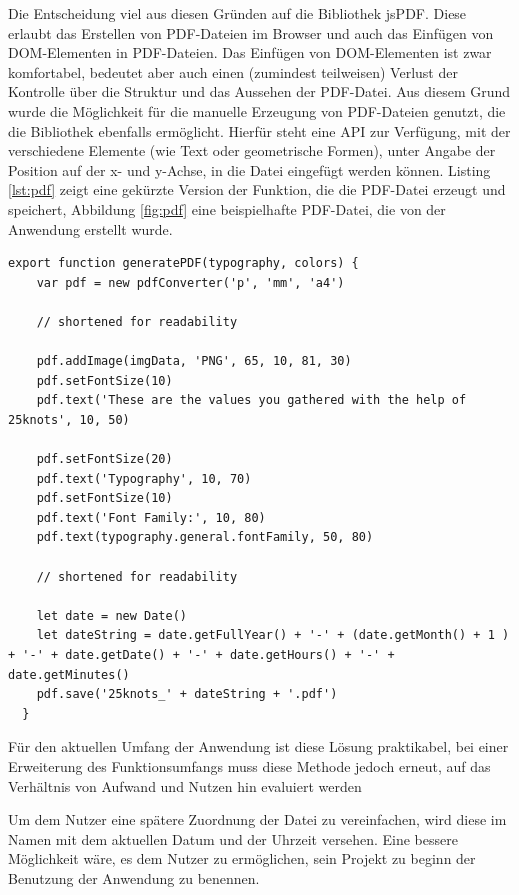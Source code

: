 
Die Entscheidung viel aus diesen Gründen auf die Bibliothek jsPDF\footnotemark{}. Diese erlaubt das Erstellen von PDF-Dateien im Browser und auch das Einfügen von DOM-Elementen in PDF-Dateien.
Das Einfügen von DOM-Elementen ist zwar komfortabel, bedeutet aber auch einen (zumindest teilweisen) Verlust der Kontrolle über die Struktur und das Aussehen der PDF-Datei.
Aus diesem Grund wurde die Möglichkeit für die manuelle Erzeugung von PDF-Dateien genutzt, die die Bibliothek ebenfalls ermöglicht. Hierfür steht eine API zur Verfügung, mit der verschiedene Elemente (wie Text oder geometrische Formen), unter Angabe der Position auf der x- und y-Achse, in die Datei eingefügt werden können. Listing \ref{lst:pdf} zeigt eine gekürzte Version der Funktion, die die PDF-Datei erzeugt und speichert, Abbildung \ref{fig:pdf} eine beispielhafte PDF-Datei, die von der Anwendung erstellt wurde.

\begin{lstlisting}[caption={Beispilehafte Generierung einer PDF-Datei}, label=lst:pdf]
  export function generatePDF(typography, colors) {
    var pdf = new pdfConverter('p', 'mm', 'a4')

    // shortened for readability

    pdf.addImage(imgData, 'PNG', 65, 10, 81, 30)
    pdf.setFontSize(10)
    pdf.text('These are the values you gathered with the help of 25knots', 10, 50)

    pdf.setFontSize(20)
    pdf.text('Typography', 10, 70)
    pdf.setFontSize(10)
    pdf.text('Font Family:', 10, 80)
    pdf.text(typography.general.fontFamily, 50, 80)

    // shortened for readability

    let date = new Date()
    let dateString = date.getFullYear() + '-' + (date.getMonth() + 1 ) + '-' + date.getDate() + '-' + date.getHours() + '-' + date.getMinutes()
    pdf.save('25knots_' + dateString + '.pdf')
  }
\end{lstlisting}


Für den aktuellen Umfang der Anwendung ist diese Lösung praktikabel, bei einer Erweiterung des Funktionsumfangs muss diese Methode jedoch erneut, auf das Verhältnis von Aufwand und Nutzen hin evaluiert werden

Um dem Nutzer eine spätere Zuordnung der Datei zu vereinfachen, wird diese im Namen mit dem aktuellen Datum und der Uhrzeit versehen. Eine bessere Möglichkeit wäre, es dem Nutzer zu ermöglichen, sein Projekt zu beginn der Benutzung der Anwendung zu benennen.

